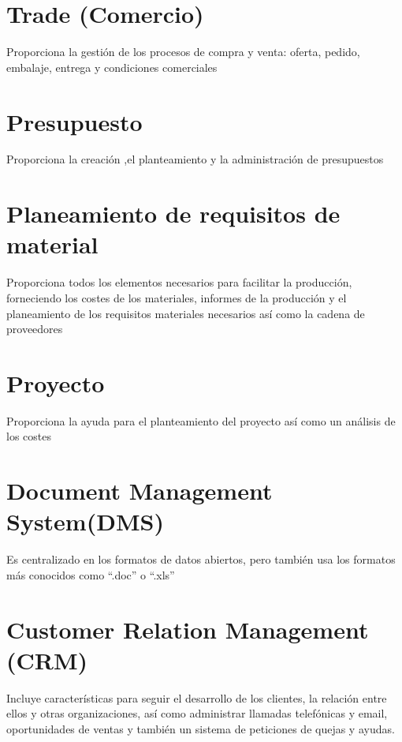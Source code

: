 \section{Trade  (Comercio)}
Proporciona la gestión de los procesos de compra y venta: oferta, pedido, embalaje, entrega y condiciones comerciales

\section{Presupuesto}
Proporciona la creación ,el planteamiento y la administración de presupuestos

\section{Planeamiento de requisitos de material}
Proporciona todos los elementos necesarios para facilitar la producción, forneciendo los costes de los materiales, informes de la producción y el planeamiento de los requisitos materiales necesarios así como la cadena de proveedores

\section{Proyecto}
Proporciona la ayuda para el planteamiento del proyecto así como un análisis de los costes

\section{Document Management System(DMS)}
Es centralizado en los formatos de datos abiertos, pero también usa los formatos más conocidos como “.doc” o “.xls”

\section{Customer Relation Management (CRM)}
Incluye características para seguir el desarrollo de los clientes, la relación entre ellos y otras organizaciones, así como administrar llamadas telefónicas y email, oportunidades de ventas y también un sistema de peticiones de quejas y ayudas.
